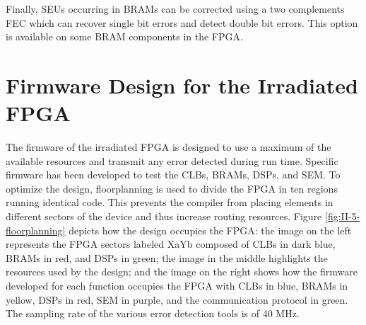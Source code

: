     Finally, SEUs occurring in BRAMs can be corrected using a two complements FEC which can recover single bit errors and detect double bit errors. This option is available on some BRAM components in the FPGA.

  \section{Firmware Design for the Irradiated FPGA}

    The firmware of the irradiated FPGA is designed to use a maximum of the available resources and transmit any error detected during run time. Specific firmware has been developed to test the CLBs, BRAMs, DSPs, and SEM. To optimize the design, floorplanning is used to divide the FPGA in ten regions running identical code. This prevents the compiler from placing elements in different sectors of the device and thus increase routing resources. Figure \ref{fig:II-5-floorplanning} depicts how the design occupies the FPGA: the image on the left represents the FPGA sectors labeled XaYb composed of CLBs in dark blue, BRAMs in red, and DSPs in green; the image in the middle highlights the resources used by the design; and the image on the right shows how the firmware developed for each function occupies the FPGA with CLBs in blue, BRAMs in yellow, DSPs in red, SEM in purple, and the communication protocol in green. The sampling rate of the various error detection tools is of 40 MHz.

